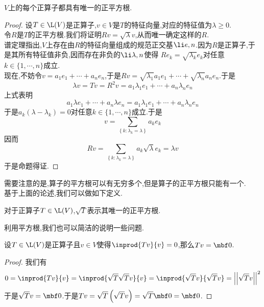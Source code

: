 \documentclass{ctexart}
\begin{document}
\begin{formal}[2.2 正算子具有唯一正平方根]
    $V$上的每个正算子都具有唯一的正平方根.
\end{formal}
\begin{proof}
    设$T\in\L(V)$是正算子,$v\in V$是$T$的特征向量,对应的特征值为$\lambda\geqslant0$.\\
    令$R$是$T$的正平方根.我们将证明$Rv=\sqrt{\lambda}v$,从而唯一确定这样的$R$.\\
    谱定理指出,$V$上存在由$R$的特征向量组成的规范正交基$\li e,n$.因为$R$是正算子,于是其所有特征值非负,因而存在非负的$\li\lambda,n$使得%
    $Re_k=\sqrt{\lambda_k}e_k$对任意$k\in\{1,\cdots,n\}$成立.\\
    现在,不妨令$v=a_1e_1+\cdots+a_ne_n$,于是$Rv=\sqrt{\lambda_1}a_1e_1+\cdots+\sqrt{\lambda_n}a_ne_n$.于是
    \[\lambda v=Tv=R^2v=a_1\lambda_1e_1+\cdots+a_n\lambda_ne_n\]
    上式表明
    \[a_1\lambda e_1+\cdots+a_n\lambda e_n=a_1\lambda_1e_1+\cdots+a_n\lambda_ne_n\]
    于是$a_k\left(\lambda-\lambda_k\right)=0$对任意$k\in\{1,\cdots,n\}$成立.于是
    \[v=\sum_{\left\{k:\lambda_k=\lambda\right\}}a_ke_k\]
    因而
    \[Rv=\sum_{\left\{k:\lambda_k=\lambda\right\}}a_k\sqrt{\lambda}e_k=\lambda v\]
    于是命题得证.
\end{proof}\noindent
需要注意的是,算子的平方根可以有无穷多个,但是算子的正平方根只能有一个.\\
基于上面的论述,我们可以做如下定义.
\begin{definition}[2.3 定义:$\sqrt{T}$]
    对于正算子$T\in\L(V)$,$\sqrt{T}$表示其唯一的正平方根.
\end{definition}\noindent
利用平方根,我们也可以简洁的说明一些问题.
\begin{formal}[2.4 正算子的性质II]
    设$T\in\L(V)$是正算子且$v\in V$使得$\inprod{Tv}{v}=0$,那么$Tv=\mbf0$.
\end{formal}
\begin{proof}
    我们有
    \[0=\inprod{Tv}{v}=\inprod{\sqrt{T}\sqrt{T}v}{v}=\inprod{\sqrt{T}v}{\sqrt{T}v}=\left|\left|\sqrt{T}v\right|\right|^2\]
    于是$\sqrt{T}v=\mbf0$.于是$Tv=\sqrt{T}\left(\sqrt{T}v\right)=\sqrt{T}\mbf0=\mbf0$.
\end{proof}
\end{document}

